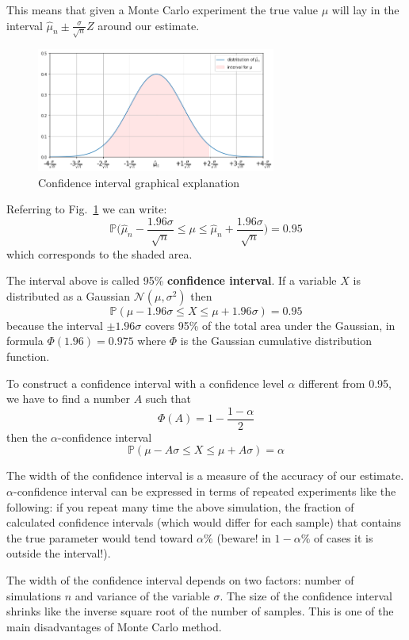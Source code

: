This means that given a Monte Carlo experiment the true value $\mu$ will lay in the interval $\hat{\mu}_n \pm  \frac{\sigma}{\sqrt{n}}Z$ around our estimate. 
\begin{figure}[h]
\centering
\includegraphics[width=0.7\textwidth]{confidence_interval.png}
\caption{Confidence interval graphical explanation}
\label{fig:confidence}
\end{figure}
Referring to Fig.~\ref{fig:confidence} we can write:
\[\mathbb{P}\Big(\hat{\mu}_n - \frac{1.96\sigma}{\sqrt{n}} \le \mu \le \hat{\mu}_n + \frac{1.96\sigma}{\sqrt{n}}\Big) = 0.95 \]
which corresponds to the shaded area.

The interval above is called 95\% \textbf{confidence interval}. If a variable $X$ is distributed as a Gaussian $\mathcal{N}(\mu, \sigma^2)$ then
\[\mathbb{P}(\mu - 1.96\sigma \le X \le \mu+ 1.96\sigma) = 0.95 \]
because the interval $\pm 1.96\sigma$ covers 95\% of the total area under the Gaussian, in formula $\Phi(1.96)=0.975$ where $\Phi$ is the Gaussian cumulative distribution function.

To construct a confidence interval with a confidence level $\alpha$ different from 0.95, we have to find a number $A$ such that 
\[\Phi(A) = 1 - \frac{1-\alpha}{2}\]
then the $\alpha$-confidence interval
\[\mathbb{P}(\mu - A\sigma \le X \le \mu+ A\sigma) = \alpha \]

The width of the confidence interval is a measure of the accuracy of our estimate.
$\alpha$-confidence interval can be expressed in terms of repeated
experiments like the following: if you repeat many time the above simulation,
the fraction of calculated confidence intervals (which would differ for each sample) that contains
the true parameter would tend toward $\alpha \%$ (beware! in $1-\alpha\%$ of cases it is outside the interval!).

The width of the confidence interval depends on two factors: number of simulations $n$ and variance of the variable $\sigma$.
The size of the confidence interval shrinks like the inverse square root of the number of samples. This is
one of the main disadvantages of Monte Carlo method.

